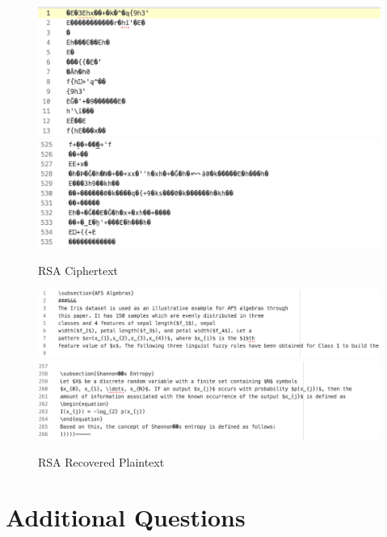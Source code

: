 \documentclass[]{article}
\begin{document}
\begin{figure}[H]
	\includegraphics[width=\textwidth]{rsa_cipher1.png}
	\includegraphics[width=\textwidth]{rsa_cipher2.png}	
	\caption{RSA Ciphertext}
	\centering
\end{figure}

\begin{figure}[H]
	\includegraphics[height=\textheight/6,width=\textwidth]{rsa_plain1.png}
	\includegraphics[height=\textheight/6,width=\textwidth]{rsa_plain2.png}	
	\caption{RSA Recovered Plaintext}
	\centering
\end{figure}

\pagebreak


\vspace*{-0.8cm}
\section*{\hfil Additional Questions\hfil}
\end{document}
